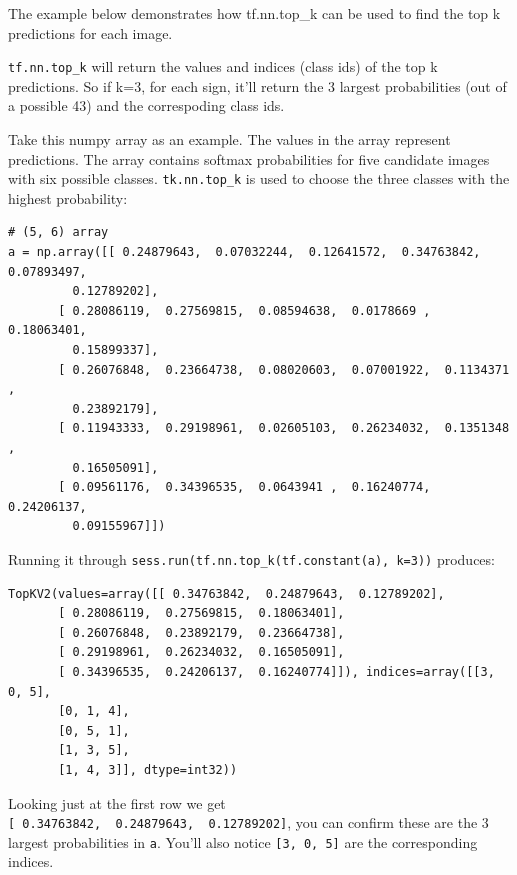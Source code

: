 \documentclass[11pt]{article}
\begin{document}
The example below demonstrates how tf.nn.top\_k can be used to find the
top k predictions for each image.

\texttt{tf.nn.top\_k} will return the values and indices (class ids) of
the top k predictions. So if k=3, for each sign, it'll return the 3
largest probabilities (out of a possible 43) and the correspoding class
ids.

Take this numpy array as an example. The values in the array represent
predictions. The array contains softmax probabilities for five candidate
images with six possible classes. \texttt{tk.nn.top\_k} is used to
choose the three classes with the highest probability:

\begin{verbatim}
# (5, 6) array
a = np.array([[ 0.24879643,  0.07032244,  0.12641572,  0.34763842,  0.07893497,
         0.12789202],
       [ 0.28086119,  0.27569815,  0.08594638,  0.0178669 ,  0.18063401,
         0.15899337],
       [ 0.26076848,  0.23664738,  0.08020603,  0.07001922,  0.1134371 ,
         0.23892179],
       [ 0.11943333,  0.29198961,  0.02605103,  0.26234032,  0.1351348 ,
         0.16505091],
       [ 0.09561176,  0.34396535,  0.0643941 ,  0.16240774,  0.24206137,
         0.09155967]])
\end{verbatim}

Running it through \texttt{sess.run(tf.nn.top\_k(tf.constant(a),\ k=3))}
produces:

\begin{verbatim}
TopKV2(values=array([[ 0.34763842,  0.24879643,  0.12789202],
       [ 0.28086119,  0.27569815,  0.18063401],
       [ 0.26076848,  0.23892179,  0.23664738],
       [ 0.29198961,  0.26234032,  0.16505091],
       [ 0.34396535,  0.24206137,  0.16240774]]), indices=array([[3, 0, 5],
       [0, 1, 4],
       [0, 5, 1],
       [1, 3, 5],
       [1, 4, 3]], dtype=int32))
\end{verbatim}

Looking just at the first row we get
\texttt{{[}\ 0.34763842,\ \ 0.24879643,\ \ 0.12789202{]}}, you can
confirm these are the 3 largest probabilities in \texttt{a}. You'll also
notice \texttt{{[}3,\ 0,\ 5{]}} are the corresponding indices.
\end{document}
